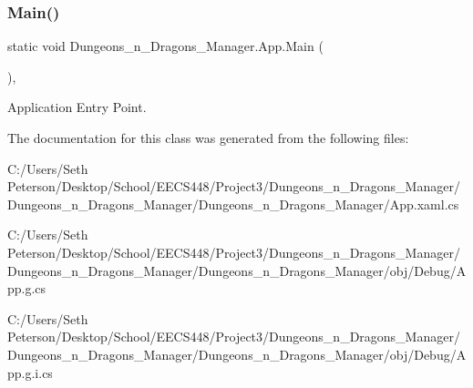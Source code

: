 \subsubsection{\texorpdfstring{Main()}{Main()}\hspace{0.1cm}{\footnotesize\ttfamily [4/4]}}
{\footnotesize\ttfamily static void Dungeons\+\_\+n\+\_\+\+Dragons\+\_\+\+Manager.\+App.\+Main (\begin{DoxyParamCaption}{ }\end{DoxyParamCaption})\hspace{0.3cm}{\ttfamily [inline]}, {\ttfamily [static]}}



Application Entry Point. 



The documentation for this class was generated from the following files\+:\begin{DoxyCompactItemize}
\item 
C\+:/\+Users/\+Seth Peterson/\+Desktop/\+School/\+E\+E\+C\+S448/\+Project3/\+Dungeons\+\_\+n\+\_\+\+Dragons\+\_\+\+Manager/\+Dungeons\+\_\+n\+\_\+\+Dragons\+\_\+\+Manager/\+Dungeons\+\_\+n\+\_\+\+Dragons\+\_\+\+Manager/App.\+xaml.\+cs\item 
C\+:/\+Users/\+Seth Peterson/\+Desktop/\+School/\+E\+E\+C\+S448/\+Project3/\+Dungeons\+\_\+n\+\_\+\+Dragons\+\_\+\+Manager/\+Dungeons\+\_\+n\+\_\+\+Dragons\+\_\+\+Manager/\+Dungeons\+\_\+n\+\_\+\+Dragons\+\_\+\+Manager/obj/\+Debug/App.\+g.\+cs\item 
C\+:/\+Users/\+Seth Peterson/\+Desktop/\+School/\+E\+E\+C\+S448/\+Project3/\+Dungeons\+\_\+n\+\_\+\+Dragons\+\_\+\+Manager/\+Dungeons\+\_\+n\+\_\+\+Dragons\+\_\+\+Manager/\+Dungeons\+\_\+n\+\_\+\+Dragons\+\_\+\+Manager/obj/\+Debug/App.\+g.\+i.\+cs\end{DoxyCompactItemize}
